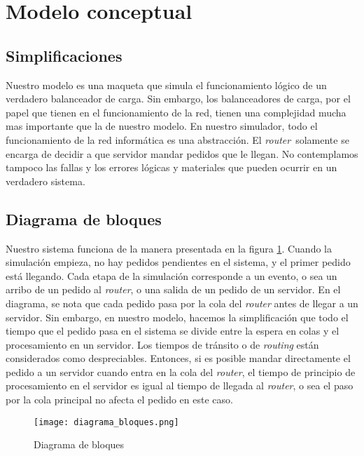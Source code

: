 \section{Modelo conceptual}

\subsection{Simplificaciones}

Nuestro modelo es una maqueta que simula el funcionamiento lógico de un verdadero balanceador de carga. Sin embargo, los
balanceadores de carga, por el papel que tienen en el funcionamiento de la red, tienen una complejidad mucha mas
importante que la de nuestro modelo. En nuestro simulador, todo el funcionamiento de la red informática es una
abstracción. El \textit{router} solamente se encarga de decidir a que servidor mandar pedidos que le llegan. No
contemplamos tampoco las fallas y los errores lógicas y materiales que pueden ocurrir en un verdadero sistema.

\subsection{Diagrama de bloques}

Nuestro sistema funciona de la manera presentada en la figura \ref{fig:diagrama-bloques}. Cuando la simulación empieza,
no hay pedidos pendientes en el sistema, y el primer pedido está llegando. Cada etapa de la simulación corresponde a un
evento, o sea un arribo de un pedido al \textit{router}, o una salida de un pedido de un servidor. En el diagrama, se
nota que cada pedido pasa por la cola del \textit{router} antes de llegar a un servidor. Sin embargo, en nuestro modelo,
hacemos la simplificación que todo el tiempo que el pedido pasa en el sistema se divide entre la espera en colas y el
procesamiento en un servidor. Los tiempos de tránsito o de \textit{routing} están considerados como despreciables.
Entonces, si es posible mandar directamente el pedido a un servidor cuando entra en la cola del \textit{router}, el
tiempo de principio de procesamiento en el servidor es igual al tiempo de llegada al \textit{router}, o sea el paso por
la cola principal no afecta el pedido en este caso.

\begin{figure}[h]
    \centering
    \texttt{[image: diagrama\_bloques.png]}
    \caption{Diagrama de bloques}
    \label{fig:diagrama-bloques}
\end{figure}

